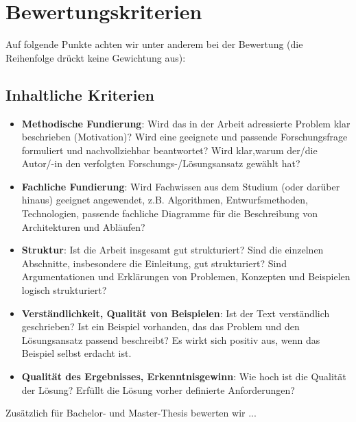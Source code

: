 \chapter{Bewertungskriterien}
\label{chap:bewertungskriterien}

Auf folgende Punkte achten wir unter anderem bei der Bewertung (die Reihenfolge drückt keine Gewichtung aus):

\section{Inhaltliche Kriterien}
\label{sec:inhaltliche-kriterien}

    \begin{itemize}
    
        \item \textbf{Methodische Fundierung}: Wird das in der Arbeit adressierte Problem klar beschrieben (Motivation)? Wird eine geeignete und passende Forschungsfrage formuliert und nachvollziehbar beantwortet? Wird klar,warum der/die Autor/-in den verfolgten Forschungs-/Lösungsansatz gewählt hat?
        
        \item \textbf{Fachliche Fundierung}: Wird Fachwissen aus dem Studium (oder darüber hinaus) geeignet angewendet, z.B. Algorithmen, Entwurfsmethoden, Technologien, passende fachliche Diagramme für die Beschreibung von Architekturen und Abläufen?
             
        \item \textbf{Struktur}: Ist die Arbeit insgesamt gut strukturiert? Sind die einzelnen Abschnitte, insbesondere die Einleitung, gut strukturiert? Sind Argumentationen und Erklärungen von Problemen, Konzepten und Beispielen logisch strukturiert?
	
		\item \textbf{Verständlichkeit, Qualität von Beispielen}: Ist der Text verständlich geschrieben? Ist ein Beispiel vorhanden, das das Problem und den Lösungsansatz passend beschreibt? Es wirkt sich positiv aus, wenn das Beispiel selbst erdacht ist.
		
        \item \textbf{Qualität des Ergebnisses, Erkenntnisgewinn}: Wie hoch ist die Qualität der Lösung? Erfüllt die Lösung vorher definierte Anforderungen? 
                
    \end{itemize}
Zusätzlich für Bachelor- und Master-Thesis bewerten wir ...
